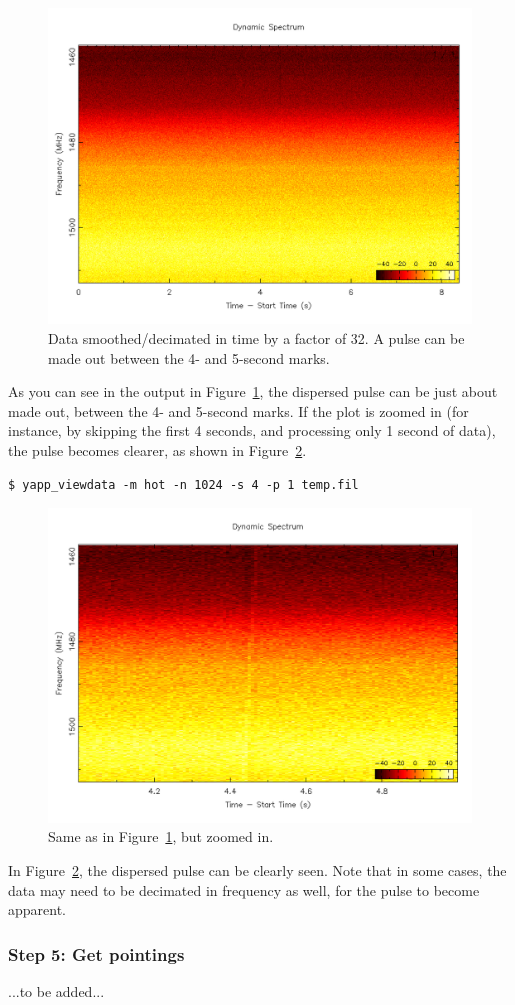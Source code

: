 \documentclass{article}
\begin{document}
\begin{figure}[h]
\includegraphics[width=\textwidth]{fb_tsnofs.png}
\caption{Data smoothed/decimated in time by a factor of 32. A pulse can be made
    out between the 4- and 5-second marks.
    \label{fig_fb_tsnofs}}
\end{figure}

As you can see in the output in Figure~\ref{fig_fb_tsnofs}, the dispersed pulse
can be just about made out, between the 4- and 5-second marks. If the plot is
zoomed in (for instance, by skipping the first 4 seconds, and processing only 1
second of data), the pulse becomes clearer, as shown in
Figure~\ref{fig_fb_tsnofs_zoomed}.

\small{
\begin{verbatim}
$ yapp_viewdata -m hot -n 1024 -s 4 -p 1 temp.fil
\end{verbatim}
}

\begin{figure}[h]
\includegraphics[width=\textwidth]{fb_tsnofs_zoomed.png}
\caption{Same as in Figure~\ref{fig_fb_tsnofs}, but zoomed in.
    \label{fig_fb_tsnofs_zoomed}}
\end{figure}

In Figure~\ref{fig_fb_tsnofs_zoomed}, the dispersed pulse can be clearly seen.
Note that in some cases, the data may need to be decimated in frequency as
well, for the pulse to become apparent.


\subsubsection{Step 5: Get pointings}

...to be added...
\end{document}

